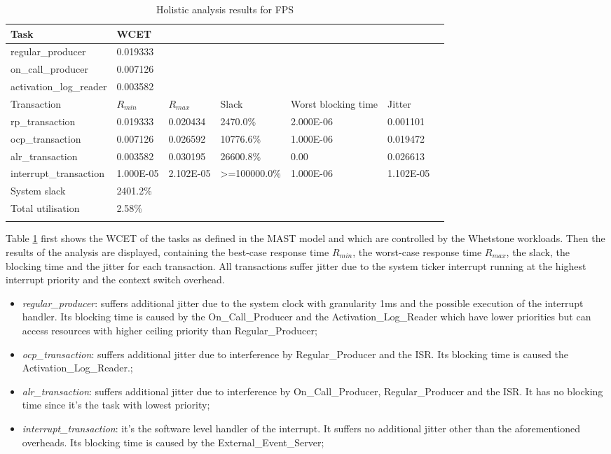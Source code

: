 \documentclass{article}
\begin{document}
\begin{longtable}{lllllll}
   \toprule
   Task & WCET \\
   \midrule
   regular\_producer & 0.019333 \\
   on\_call\_producer & 0.007126 \\
   activation\_log\_reader & 0.003582 \\
   \toprule
   \toprule
   Transaction & $R_{min}$ & $R_{max}$ & Slack & Worst blocking time & Jitter \\
   \midrule
   rp\_transaction & 0.019333 & 0.020434  & 2470.0\% &  2.000E-06 & 0.001101 \\
   ocp\_transaction & 0.007126 & 0.026592 & 10776.6\% & 1.000E-06 & 0.019472 \\
   alr\_transaction & 0.003582 & 0.030195 & 26600.8\% & 0.00 & 0.026613 \\
   interrupt\_transaction & 1.000E-05 & 2.102E-05 & >=100000.0\% & 1.000E-06 & 1.102E-05 \\
   \toprule
   \toprule
   System slack & 2401.2\% \\
   Total utilisation & 2.58\% \\
   \bottomrule
\caption{Holistic analysis results for FPS}
\label{tab:holistic-fps}
\end{longtable}

Table \ref{tab:holistic-fps} first shows the WCET of the tasks as defined in the MAST model and which are controlled by the Whetstone workloads. Then the results of the analysis are displayed, containing the best-case response time $R_{min}$, the worst-case response time $R_{max}$, the slack, the blocking time and the jitter for each transaction. All transactions suffer jitter due to the system ticker interrupt running at the highest interrupt priority and the context switch overhead.

\begin{itemize}
   \item \textit{regular\_producer}: suffers additional jitter due to the system clock with granularity 1ms and the possible execution of the interrupt handler. Its blocking time is caused by the On\_Call\_Producer and the Activation\_Log\_Reader which have lower priorities but can access resources with higher ceiling priority than Regular\_Producer;
   \item \textit{ocp\_transaction}: suffers additional jitter due to interference by Regular\_Producer and the ISR. Its blocking time is caused the Activation\_Log\_Reader.;
   \item \textit{alr\_transaction}: suffers additional jitter due to interference by On\_Call\_Producer, Regular\_Producer and the ISR. It has no blocking time since it's the task with lowest priority;
   \item \textit{interrupt\_transaction}: it's the software level handler of the interrupt. It suffers no additional jitter other than the aforementioned overheads. Its blocking time is caused by the External\_Event\_Server;
\end{itemize}
\end{document}
